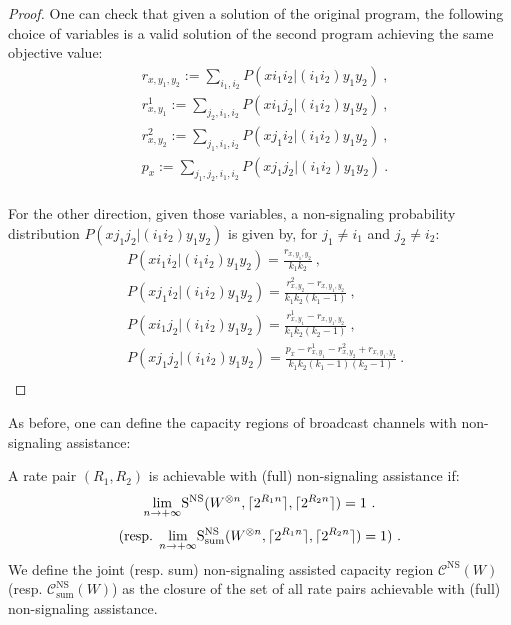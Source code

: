 \begin{proof}
  One can check that given a solution of the original program, the following choice of variables is a valid solution of the second program achieving the same objective value:
\begin{equation}
  \begin{aligned}
    &r_{x,y_1,y_2} := \sum_{i_1,i_2} P(xi_1i_2|(i_1i_2)y_1y_2)\ ,\\
    &r^1_{x,y_1} := \sum_{j_2,i_1,i_2} P(xi_1j_2|(i_1i_2)y_1y_2)\ ,\\
    &r^2_{x,y_2} := \sum_{j_1,i_1,i_2} P(xj_1i_2|(i_1i_2)y_1y_2)\ ,\\
    &p_x := \sum_{j_1,j_2,i_1,i_2} P(xj_1j_2|(i_1i_2)y_1y_2) \ .\\
  \end{aligned}
\end{equation}

For the other direction, given those variables, a non-signaling probability distribution $P(xj_1j_2|(i_1i_2)y_1y_2)$ is given by, for $j_1 \not= i_1$ and $j_2 \not= i_2$:
\begin{equation}
  \begin{aligned}
    &P(xi_1i_2|(i_1i_2)y_1y_2) = \frac{r_{x,y_1,y_2}}{k_1k_2}  \ ,\\
    &P(xj_1i_2|(i_1i_2)y_1y_2) = \frac{r^2_{x,y_2} - r_{x,y_1,y_2}}{k_1k_2(k_1-1)}  \ ,\\
    &P(xi_1j_2|(i_1i_2)y_1y_2) = \frac{r^1_{x,y_1} - r_{x,y_1,y_2}}{k_1k_2(k_2-1)} \ ,\\
    &P(xj_1j_2|(i_1i_2)y_1y_2) = \frac{p_{x} -  r^1_{x,y_1} - r^2_{x,y_2} + r_{x,y_1,y_2}}{k_1k_2(k_1-1)(k_2-1)} \ .\\
  \end{aligned}
\end{equation}
\end{proof}

As before, one can define the capacity regions of broadcast channels with non-signaling assistance:

\begin{defi}
  A rate pair $(R_1,R_2)$ is achievable with (full) non-signaling assistance if:
  \[ \underset{n \rightarrow +\infty}{\lim} \mathrm{S}^{\mathrm{NS}}(W^{\otimes n},\lceil2^{R_1n}\rceil,\lceil2^{R_2n}\rceil) = 1 \ . \]
  \[ \text{(resp. }\underset{n \rightarrow +\infty}{\lim} \mathrm{S}^{\mathrm{NS}}_{\text{sum}}(W^{\otimes n},\lceil2^{R_1n}\rceil,\lceil2^{R_2n}\rceil) = 1 )\ . \]
  We define the joint (resp. sum) non-signaling assisted capacity region $\mathcal{C}^{\mathrm{NS}}(W)$ (resp. $\mathcal{C}^{\mathrm{NS}}_{\text{sum}}(W)$) as the closure of the set of all rate pairs achievable with (full) non-signaling assistance.
\end{defi}

